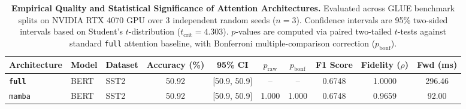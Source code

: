 \begin{table}[t]
\centering
\small
\caption{\textbf{Empirical Quality and Statistical Significance of Attention Architectures.} Evaluated across GLUE benchmark splits on NVIDIA RTX 4070 GPU over 3 independent random seeds ($n=3$). Confidence intervals are 95\% two-sided intervals based on Student's $t$-distribution ($t_{\text{crit}}=4.303$). $p$-values are computed via paired two-tailed $t$-tests against standard \texttt{full} attention baseline, with Bonferroni multiple-comparison correction ($p_{\text{bonf}}$).}
\label{tab:quality_benchmark_results}
\begin{tabular}{l l l c c c c c c c}
\toprule
\textbf{Architecture} & \textbf{Model} & \textbf{Dataset} & \textbf{Accuracy (\%)} & \textbf{95\% CI} & \textbf{$p_{\text{raw}}$} & \textbf{$p_{\text{bonf}}$} & \textbf{F1 Score} & \textbf{Fidelity ($\rho$)} & \textbf{Fwd (ms)} \\
\midrule
\textbf{\texttt{full}} & BERT & SST2 & 50.92 & [50.9, 50.9] & -- & -- & 0.6748 & 1.0000 & 296.46 \\
\texttt{mamba} & BERT & SST2 & 50.92 & [50.9, 50.9] & 1.000 & 1.000 & 0.6748 & 0.9659 & 92.00 \\
\bottomrule
\end{tabular}
\end{table}